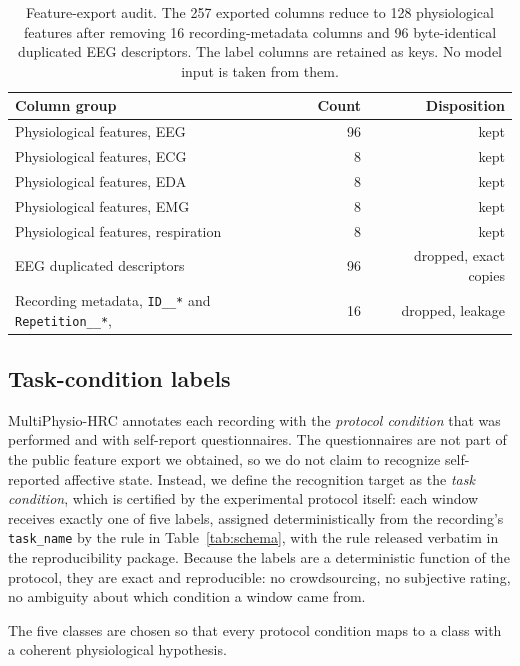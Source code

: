 \documentclass{llncs}
\begin{document}
\begin{table}[t]
\centering
\small
\caption{Feature-export audit. The 257 exported columns reduce to 128 physiological
features after removing 16 recording-metadata columns and 96 byte-identical duplicated
\ac{EEG} descriptors. The label columns are retained as keys. No model input is taken
from them.}
\label{tab:audit}
\begin{tabular}{lrr}
\toprule
Column group & Count & Disposition \\
\midrule
Physiological features, \ac{EEG} & 96 & kept \\
Physiological features, \ac{ECG} & 8 & kept \\
Physiological features, \ac{EDA} & 8 & kept \\
Physiological features, \ac{EMG} & 8 & kept \\
Physiological features, respiration & 8 & kept \\
\hline
\ac{EEG} duplicated descriptors & 96 & dropped, exact copies \\
Recording metadata, \texttt{ID\_\_*} and \texttt{Repetition\_\_*}, & 16 & dropped, leakage \\
\bottomrule
\end{tabular}
\end{table}

\subsection{Task-condition labels}

MultiPhysio-\ac{HRC} annotates each recording with the \emph{protocol condition} that
was performed and with self-report questionnaires. The questionnaires are not part of
the public feature export we obtained, so we do not claim to recognize self-reported
affective state. Instead, we define the recognition target as the \emph{task
condition}, which is certified by the experimental protocol itself: each window
receives exactly one of five labels, assigned deterministically from the recording's
\texttt{task\_name} by the rule in Table~\ref{tab:schema}, with the rule released
verbatim in the reproducibility package. Because the labels are a deterministic
function of the protocol, they are exact and reproducible: no crowdsourcing, no
subjective rating, no ambiguity about which condition a window came from.

The five classes are chosen so that every protocol condition maps to a class with a
coherent physiological hypothesis.
\end{document}
